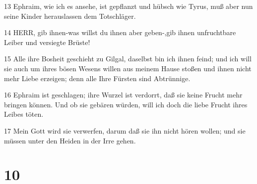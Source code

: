 \par 13 Ephraim, wie ich es ansehe, ist gepflanzt und hübsch wie Tyrus, muß aber nun seine Kinder herauslassen dem Totschläger.
\par 14 HERR, gib ihnen-was willst du ihnen aber geben-,gib ihnen unfruchtbare Leiber und versiegte Brüste!
\par 15 Alle ihre Bosheit geschieht zu Gilgal, daselbst bin ich ihnen feind; und ich will sie auch um ihres bösen Wesens willen aus meinem Hause stoßen und ihnen nicht mehr Liebe erzeigen; denn alle Ihre Fürsten sind Abtrünnige.
\par 16 Ephraim ist geschlagen; ihre Wurzel ist verdorrt, daß sie keine Frucht mehr bringen können. Und ob sie gebären würden, will ich doch die liebe Frucht ihres Leibes töten.
\par 17 Mein Gott wird sie verwerfen, darum daß sie ihn nicht hören wollen; und sie müssen unter den Heiden in der Irre gehen.

\chapter{10}

